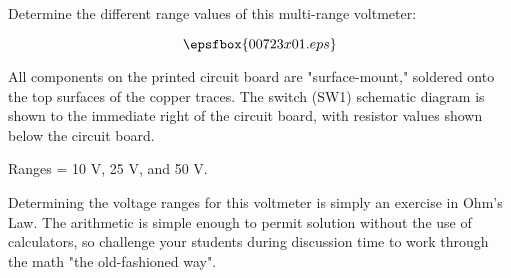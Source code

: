 

Determine the different range values of this multi-range voltmeter:

$$\epsfbox{00723x01.eps}$$

All components on the printed circuit board are "surface-mount," soldered onto the top surfaces of the copper traces.  The switch (SW1) schematic diagram is shown to the immediate right of the circuit board, with resistor values shown below the circuit board.







Ranges = 10 V, 25 V, and 50 V.







Determining the voltage ranges for this voltmeter is simply an exercise in Ohm's Law.  The arithmetic is simple enough to permit solution without the use of calculators, so challenge your students during discussion time to work through the math "the old-fashioned way".



